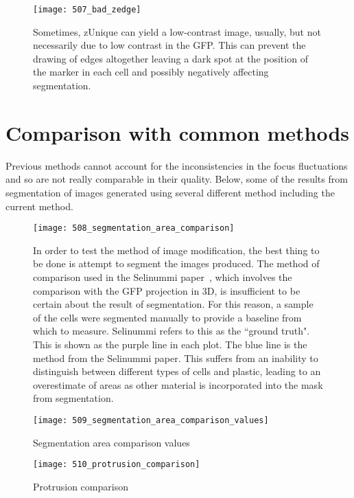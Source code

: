 \begin{figure}[h!]
 \centering
 \texttt{[image: 507\_bad\_zedge]}
 \caption[Ineffective zEdge]{
 	Sometimes, zUnique can yield a low-contrast image, usually, but not necessarily due to low contrast in the GFP. This can prevent the drawing of edges altogether leaving a dark spot at the position of the marker in each cell and possibly negatively affecting segmentation.
 }
 \label{fig:badzedge}
\end{figure}

\section{Comparison with common methods}

Previous methods cannot account for the inconsistencies in the focus fluctuations and so are not really comparable in their quality. Below, some of the results from segmentation of images generated using several different method including the current method.

\begin{figure}[h!]
 \centering
 \texttt{[image: 508\_segmentation\_area\_comparison]}
 \caption[Testing: segmentation area comparison]{
 	In order to test the method of image modification, the best thing to be done is attempt to segment the images produced. The method of comparison used in the Selinummi paper~\cite{Selinummi:09}, which involves the comparison with the GFP projection in 3D, is insufficient to be certain about the result of segmentation. For this reason, a sample of the cells were segmented manually to provide a baseline from which to measure. Selinummi refers to this as the ``ground truth". This is shown as the purple line in each plot. The blue line is the method from the Selinummi paper. This suffers from an inability to distinguish between different types of cells and plastic, leading to an overestimate of areas as other material is incorporated into the mask from segmentation.
 }
 \label{fig:areacomparison}
\end{figure}

\begin{figure}[h!]
 \centering
 \texttt{[image: 509\_segmentation\_area\_comparison\_values]}
 \caption[Testing: segmentation area comparison values]{
	Segmentation area comparison values
 }
 \label{fig:areacomparisonvalues}
\end{figure}

\begin{figure}[h!]
 \centering
 \texttt{[image: 510\_protrusion\_comparison]}
 \caption[Testing: protrusion comparison]{
 	Protrusion comparison
 }
 \label{fig:protrusioncomparison}
\end{figure}

